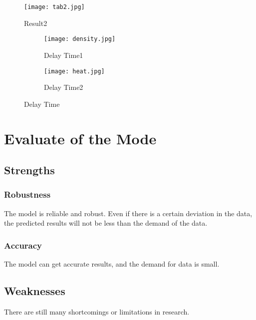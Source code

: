\documentclass{mcmthesis}
\begin{document}
\begin{figure}[htbp]
	\centering
	\texttt{[image: tab2.jpg]}
	\caption{Result2}
	\label{fig:Result2}
\end{figure}

\begin{figure}[htbp]
	\centering
	\begin{subfigure}[htbp]{.45\linewidth}
		\centering
		\texttt{[image: density.jpg]}
		\caption{Delay Time1}
		\label{fig:Delay Time1}
	\end{subfigure}
	\quad
	\begin{subfigure}[htbp]{.45\linewidth}
		\centering
		\texttt{[image: heat.jpg]}
		\caption{Delay Time2}
		\label{fig:Delay Time2}
	\end{subfigure}
	\caption{Delay Time}
	\label{fig:Delay Time}
\end{figure}

\section{Evaluate of the Mode}%
\label{sec:Evaluate of the Mode}

\subsection{Strengths}%
\label{sub:Strengths}

\subsubsection{Robustness}%
\label{ssub:Robustness}

The model is reliable and robust. Even if there is a certain deviation in the
data, the predicted results will not be less than the demand of the data.

\subsubsection{Accuracy}%
\label{ssub:Accuracy}

The model can get accurate results, and the demand for data is small.

\subsection{Weaknesses}%
\label{sub:Weaknesses}

There are still many shortcomings or limitations in research.
\end{document}
